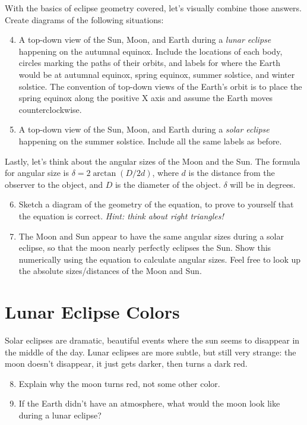 \documentclass[12pt]{article}
\begin{document}
\noindent With the basics of eclipse geometry covered, let's visually combine those answers. Create diagrams of the following situations:
\begin{enumerate}
    \setcounter{enumi}{3}
    \item A top-down view of the Sun, Moon, and Earth during a \textit{lunar eclipse} happening on the autumnal equinox. Include the locations of each body, circles marking the paths of their orbits, and labels for where the Earth would be at autumnal equinox, spring equinox, summer solstice, and winter solstice. The convention of top-down views of the Earth's orbit is to place the spring equinox along the positive X axis and assume the Earth moves counterclockwise. 
    \item A top-down view of the Sun, Moon, and Earth during a \textit{solar eclipse} happening on the summer solstice. Include all the same labels as before.
\end{enumerate}

\noindent Lastly, let's think about the angular sizes of the Moon and the Sun. The formula for angular size is $\delta = 2 \arctan(D/2d)$, where $d$ is the distance from the observer to the object, and $D$ is the diameter of the object. $\delta$ will be in degrees.
\begin{enumerate}
\setcounter{enumi}{5}
    \item Sketch a diagram of the geometry of the equation, to prove to yourself that the equation is correct. \textit{Hint: think about right triangles!}
    \item The Moon and Sun appear to have the same angular sizes during a solar eclipse, so that the moon nearly perfectly eclipses the Sun. Show this numerically using the equation to calculate angular sizes. Feel free to look up the absolute sizes/distances of the Moon and Sun.
\end{enumerate}


\section{Lunar Eclipse Colors}
Solar eclipses are dramatic, beautiful events where the sun seems to disappear in the middle of the day. Lunar eclipses are more subtle, but still very strange: the moon doesn't disappear, it just gets darker, then turns a dark red.
\begin{enumerate}
    \setcounter{enumi}{7}
    \item Explain why the moon turns red, not some other color.
    \item If the Earth didn't have an atmosphere, what would the moon look like during a lunar eclipse?
\end{enumerate}
\end{document}
